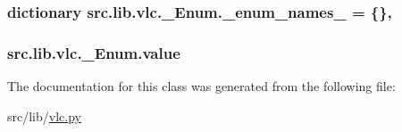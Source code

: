 \subsubsection[{\+\_\+enum\+\_\+names\+\_\+}]{\setlength{\rightskip}{0pt plus 5cm}dictionary src.\+lib.\+vlc.\+\_\+\+Enum.\+\_\+enum\+\_\+names\+\_\+ = \{\}\hspace{0.3cm}{\ttfamily [static]}, {\ttfamily [private]}}\label{classsrc_1_1lib_1_1vlc_1_1__Enum_a72ea675c63b9b3d93bd5f1d8cbde8fcb}
\hypertarget{classsrc_1_1lib_1_1vlc_1_1__Enum_abf044fdbcc58c25961d92b97a3c98eca}{}
\subsubsection[{value}]{\setlength{\rightskip}{0pt plus 5cm}src.\+lib.\+vlc.\+\_\+\+Enum.\+value}\label{classsrc_1_1lib_1_1vlc_1_1__Enum_abf044fdbcc58c25961d92b97a3c98eca}


The documentation for this class was generated from the following file\+:\begin{DoxyCompactItemize}
\item 
src/lib/\hyperlink{vlc_8py}{vlc.\+py}\end{DoxyCompactItemize}
